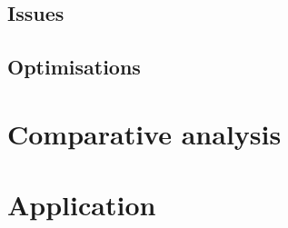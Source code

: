 \documentclass[12pt, a4paper]{article}
\begin{document}
\subsection{Issues}

\subsection{Optimisations}


\section{Comparative analysis} \label{sec:analysis}


\section{Application} \label{sec:application}




\end{document}
